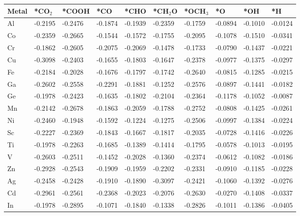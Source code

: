 \begin{table}[h]
  \centering
  {\fontsize{6}{12}\selectfont
  \begin{tabular}{*{10}{l}}
      \hline
      Metal & *CO$_2$ & *COOH& *CO     & *CHO    & *CH$_2$O& *OCH$_3$& *O      & *OH     & *H      \\
      \hline
      Al & -0.2195 & -0.2476 & -0.1874 & -0.1939 & -0.2359 & -0.1759 & -0.0894 & -0.1010 & -0.0124 \\
      Co & -0.2359 & -0.2665 & -0.1544 & -0.1572 & -0.1755 & -0.2095 & -0.1078 & -0.1510 & -0.0341 \\
      Cr & -0.1862 & -0.2605 & -0.2075 & -0.2069 & -0.1478 & -0.1733 & -0.0790 & -0.1437 & -0.0221 \\
      Cu & -0.3098 & -0.2403 & -0.1655 & -0.1803 & -0.1647 & -0.2378 & -0.0977 & -0.1375 & -0.0297 \\
      Fe & -0.2184 & -0.2028 & -0.1676 & -0.1797 & -0.1742 & -0.2640 & -0.0815 & -0.1285 & -0.0215 \\
      Ga & -0.2602 & -0.2558 & -0.2291 & -0.1881 & -0.1252 & -0.2576 & -0.0897 & -0.1441 & -0.0182 \\
      Ge & -0.1978 & -0.2423 & -0.1635 & -0.1802 & -0.2104 & -0.2364 & -0.1178 & -0.1052 & -0.0087 \\
      Mn & -0.2142 & -0.2678 & -0.1863 & -0.2059 & -0.1788 & -0.2752 & -0.0808 & -0.1425 & -0.0261 \\
      Ni & -0.2460 & -0.1948 & -0.1592 & -0.1224 & -0.1275 & -0.2506 & -0.0997 & -0.1384 & -0.0224 \\
      Sc & -0.2227 & -0.2369 & -0.1843 & -0.1667 & -0.1817 & -0.2035 & -0.0728 & -0.1416 & -0.0226 \\
      Ti & -0.1978 & -0.2263 & -0.1685 & -0.1389 & -0.1414 & -0.1795 & -0.0578 & -0.1013 & -0.0195 \\
      V  & -0.2603 & -0.2511 & -0.1452 & -0.2028 & -0.1360 & -0.2374 & -0.0612 & -0.1082 & -0.0186 \\
      Zn & -0.2928 & -0.2543 & -0.1909 & -0.1959 & -0.2202 & -0.2331 & -0.0910 & -0.1185 & -0.0228 \\
      Ag & -0.2458 & -0.2428 & -0.1910 & -0.1890 & -0.3097 & -0.2421 & -0.1060 & -0.1392 & -0.0276 \\
      Cd & -0.2961 & -0.2561 & -0.2368 & -0.2023 & -0.2076 & -0.2630 & -0.0270 & -0.1408 & -0.0337 \\
      In & -0.1978 & -0.2895 & -0.1071 & -0.1840 & -0.1338 & -0.2826 & -0.1011 & -0.1386 & -0.0405 \\

\end{tabular}}
\end{table}
